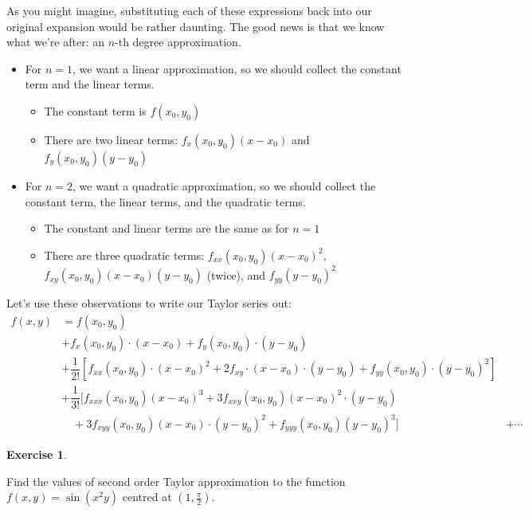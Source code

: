 \documentclass[
]{book}
\providecommand{\tightlist}{%
  \setlength{\itemsep}{0pt}\setlength{\parskip}{0pt}}
\theoremstyle{definition}
\theoremstyle{definition}
\theoremstyle{definition}
\newtheorem{exercise}{Exercise}[chapter]
\theoremstyle{definition}
\theoremstyle{remark}
\begin{document}
As you might imagine, substituting each of these expressions back into our original expansion would be rather daunting. The good news is that we know what we're after: an \(n\)-th degree approximation.

\begin{itemize}
\tightlist
\item
  For \(n=1\), we want a linear approximation, so we should collect the constant term and the linear terms.

  \begin{itemize}
  \tightlist
  \item
    The constant term is \(f(x_0,y_0)\)
  \item
    There are two linear terms: \(f_x(x_0,y_0)(x-x_0)\) and \(f_y(x_0,y_0)(y-y_0)\)
  \end{itemize}
\item
  For \(n=2\), we want a quadratic approximation, so we should collect the constant term, the linear terms, and the quadratic terms.

  \begin{itemize}
  \tightlist
  \item
    The constant and linear terms are the same as for \(n=1\)
  \item
    There are three quadratic terms: \(f_{xx}(x_0,y_0)(x-x_0)^2\), \(f_{xy}(x_0,y_0)(x-x_0)(y-y_0)\) (twice), and \(f_{yy}(y-y_0)^2\)
  \end{itemize}
\end{itemize}

Let's use these observations to write our Taylor series out:
\begin{align*}
f(x,y)&= f(x_0,y_0) \\
&+ f_x(x_0,y_0)\cdot (x-x_0) + f_y(x_0,y_0)\cdot (y-y_0)\\
&+ \dfrac{1}{2!}\left [f_{xx}(x_0,y_0)\cdot(x-x_0)^2 + 2f_{xy}\cdot(x-x_0)\cdot(y-y_0)+f_{yy}(x_0,y_0)\cdot(y-y_0)^2\right ]\\
&+ \dfrac{1}{3!} [f_{xxx}(x_0,y_0)(x-x_0)^3+3f_{xxy}(x_0,y_0)(x-x_0)^2\cdot(y-y_0)\\ & \quad +3f_{xyy}(x_0,y_0)(x-x_0)\cdot (y-y_0)^2+f_{yyy}(x_0,y_0)(y-y_0)^3  ]
& + \cdots
\end{align*}

\begin{exercise}
\protect\hypertarget{exr:unlabeled-div-265}{}\label{exr:unlabeled-div-265}

Find the values of second order Taylor approximation to the function \(f(x,y)=\sin(x^2y)\) centred at \(\left(1,\frac{\pi}{2}\right )\).

\end{exercise}
\end{document}
